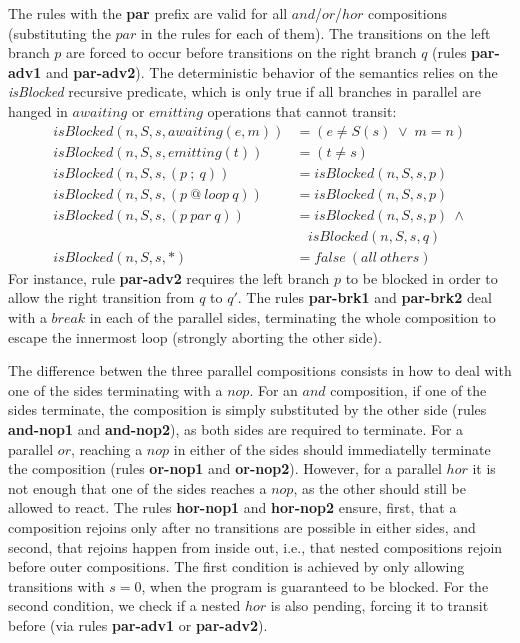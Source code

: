 \documentclass{acm_proc_article-sp}
\newcommand{\rr}[1] {{\textbf{\scriptsize{#1}}}}
\newcommand{\1}{\;}
\newcommand{\2}{\;\;}
\newcommand{\3}{\;\;\;}
\newcommand{\5}{\;\;\;\;\;}
\begin{document}
The rules with the \rr{par} prefix are valid for all $and$/$or$/$hor$ 
compositions (substituting the $par$ in the rules for each of them).
The transitions on the left branch $p$ are forced to occur before transitions 
on the right branch $q$ (rules \rr{par-adv1} and \rr{par-adv2}).
%
The deterministic behavior of the semantics relies on the \emph{isBlocked} 
recursive predicate, which is only true if all branches in parallel are hanged 
in $awaiting$ or $emitting$ operations that cannot transit:
%
{\small
\begin{align*}
  isBlocked(n,S,s, awaiting(e,m)) &= (e \neq S(s) \1\vee\1 m = n)   \\
  isBlocked(n,S,s, emitting(t))   &= (t \neq s)                     \\
  isBlocked(n,S,s, (p~;~q))       &= isBlocked(n,S,s,p)             \\
  isBlocked(n,S,s, (p~@~loop~q))  &= isBlocked(n,S,s,p)             \\
  isBlocked(n,S,s, (p~par~q))     &= isBlocked(n,S,s,p)~\wedge \\
                                     &~~~~isBlocked(n,S,s,q)             \\
  isBlocked(n,S,s, *)             &= false~(all~others)
\end{align*}
}%
%
For instance, rule \rr{par-adv2} requires the left branch $p$ to be blocked in 
order to allow the right transition from $q$ to $q'$.
%
The rules \rr{par-brk1} and \rr{par-brk2} deal with a $break$ in each of the 
parallel sides, terminating the whole composition to escape the innermost loop 
(strongly aborting the other side).

The difference betwen the three parallel compositions consists in how to deal 
with one of the sides terminating with a $nop$.
%
For an $and$ composition, if one of the sides terminate, the composition is 
simply substituted by the other side (rules \rr{and-nop1} and \rr{and-nop2}), 
as both sides are required to terminate.
%
For a parallel $or$, reaching a $nop$ in either of the sides should 
immediatelly terminate the composition (rules \rr{or-nop1} and \rr{or-nop2}).
%
However, for a parallel $hor$ it is not enough that one of the sides reaches a 
$nop$, as the other should still be allowed to react.
The rules \rr{hor-nop1} and \rr{hor-nop2} ensure, first, that a composition 
rejoins only after no transitions are possible in either sides, and second, 
that rejoins happen from inside out, i.e., that nested compositions rejoin 
before outer compositions.
The first condition is achieved by only allowing transitions with $s=0$, when 
the program is guaranteed to be blocked.
For the second condition, we check if a nested $hor$ is also pending, forcing 
it to transit before (via rules \textbf{par-adv1} or \textbf{par-adv2}).
\end{document}
